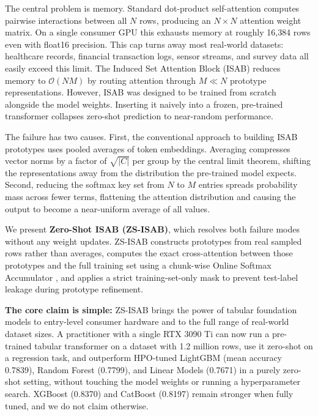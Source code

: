\documentclass[10pt]{article}
\begin{document}
The central problem is memory. Standard dot-product self-attention \citep{vaswani2017attention} computes pairwise interactions between all $N$ rows, producing an $N \times N$ attention weight matrix. On a single consumer GPU this exhausts memory at roughly 16{,}384 rows even with float16 precision. This cap turns away most real-world datasets: healthcare records, financial transaction logs, sensor streams, and survey data all easily exceed this limit. The Induced Set Attention Block (ISAB) \citep{lee2019set} reduces memory to $\mathcal{O}(NM)$ by routing attention through $M \ll N$ prototype representations. However, ISAB was designed to be trained from scratch alongside the model weights. Inserting it naively into a frozen, pre-trained transformer collapses zero-shot prediction to near-random performance.

The failure has two causes. First, the conventional approach to building ISAB prototypes uses pooled averages of token embeddings. Averaging compresses vector norms by a factor of $\sqrt{|C|}$ per group by the central limit theorem, shifting the representations away from the distribution the pre-trained model expects. Second, reducing the softmax key set from $N$ to $M$ entries spreads probability mass across fewer terms, flattening the attention distribution and causing the output to become a near-uniform average of all values.

We present \textbf{Zero-Shot ISAB (ZS-ISAB)}, which resolves both failure modes without any weight updates. ZS-ISAB constructs prototypes from real sampled rows rather than averages, computes the exact cross-attention between those prototypes and the full training set using a chunk-wise Online Softmax Accumulator \citep{milakov2018online}, and applies a strict training-set-only mask to prevent test-label leakage during prototype refinement.

\textbf{The core claim is simple:} ZS-ISAB brings the power of tabular foundation models to entry-level consumer hardware and to the full range of real-world dataset sizes. A practitioner with a single RTX 3090 Ti can now run a pre-trained tabular transformer on a dataset with 1.2 million rows, use it zero-shot on a regression task, and outperform HPO-tuned LightGBM (mean accuracy 0.7839), Random Forest (0.7799), and Linear Models (0.7671) in a purely zero-shot setting, without touching the model weights or running a hyperparameter search. XGBoost (0.8370) and CatBoost (0.8197) remain stronger when fully tuned, and we do not claim otherwise.
\end{document}
